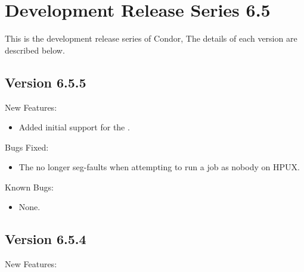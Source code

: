 \section{\label{sec:History-6-5}Development Release Series 6.5}

This is the development release series of Condor,
The details of each version are described below.

\subsection{\label{sec:New-6-5-5}Version 6.5.5}

\noindent New Features:

\begin{itemize}

\item Added initial support for the .

\end{itemize}

\noindent Bugs Fixed:

\begin{itemize}

\item The  no longer seg-faults when attempting to run
  a job as nobody on HPUX.

\end{itemize}

\noindent Known Bugs:

\begin{itemize}

\item None.

\end{itemize}



\subsection{\label{sec:New-6-5-4}Version 6.5.4}

\noindent New Features:

